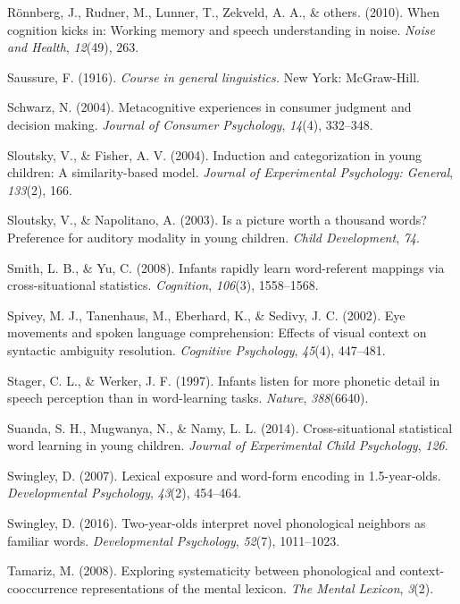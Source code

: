 \documentclass[english,floatsintext,man]{apa6}
\theoremstyle{definition}
\theoremstyle{definition}
\theoremstyle{definition}
\theoremstyle{remark}
\begin{document}
\hypertarget{ref-ronnberg2010}{}
Rönnberg, J., Rudner, M., Lunner, T., Zekveld, A. A., \& others. (2010).
When cognition kicks in: Working memory and speech understanding in
noise. \emph{Noise and Health}, \emph{12}(49), 263.

\hypertarget{ref-saussure1916}{}
Saussure, F. (1916). \emph{Course in general linguistics.} New York:
McGraw-Hill.

\hypertarget{ref-schwarz2004}{}
Schwarz, N. (2004). Metacognitive experiences in consumer judgment and
decision making. \emph{Journal of Consumer Psychology}, \emph{14}(4),
332--348.

\hypertarget{ref-sloutsky2004}{}
Sloutsky, V., \& Fisher, A. V. (2004). Induction and categorization in
young children: A similarity-based model. \emph{Journal of Experimental
Psychology: General}, \emph{133}(2), 166.

\hypertarget{ref-sloutsky2003}{}
Sloutsky, V., \& Napolitano, A. (2003). Is a picture worth a thousand
words? Preference for auditory modality in young children. \emph{Child
Development}, \emph{74}.

\hypertarget{ref-smith08}{}
Smith, L. B., \& Yu, C. (2008). Infants rapidly learn word-referent
mappings via cross-situational statistics. \emph{Cognition},
\emph{106}(3), 1558--1568.

\hypertarget{ref-spivey2002}{}
Spivey, M. J., Tanenhaus, M., Eberhard, K., \& Sedivy, J. C. (2002). Eye
movements and spoken language comprehension: Effects of visual context
on syntactic ambiguity resolution. \emph{Cognitive Psychology},
\emph{45}(4), 447--481.

\hypertarget{ref-stager1997}{}
Stager, C. L., \& Werker, J. F. (1997). Infants listen for more phonetic
detail in speech perception than in word-learning tasks. \emph{Nature},
\emph{388}(6640).

\hypertarget{ref-suanda2014}{}
Suanda, S. H., Mugwanya, N., \& Namy, L. L. (2014). Cross-situational
statistical word learning in young children. \emph{Journal of
Experimental Child Psychology}, \emph{126}.

\hypertarget{ref-Swingley2007}{}
Swingley, D. (2007). Lexical exposure and word-form encoding in
1.5-year-olds. \emph{Developmental Psychology}, \emph{43}(2), 454--464.

\hypertarget{ref-Swingley2016}{}
Swingley, D. (2016). Two-year-olds interpret novel phonological
neighbors as familiar words. \emph{Developmental Psychology},
\emph{52}(7), 1011--1023.

\hypertarget{ref-Tamariz2008}{}
Tamariz, M. (2008). Exploring systematicity between phonological and
context-cooccurrence representations of the mental lexicon. \emph{The
Mental Lexicon}, \emph{3}(2).
\end{document}
